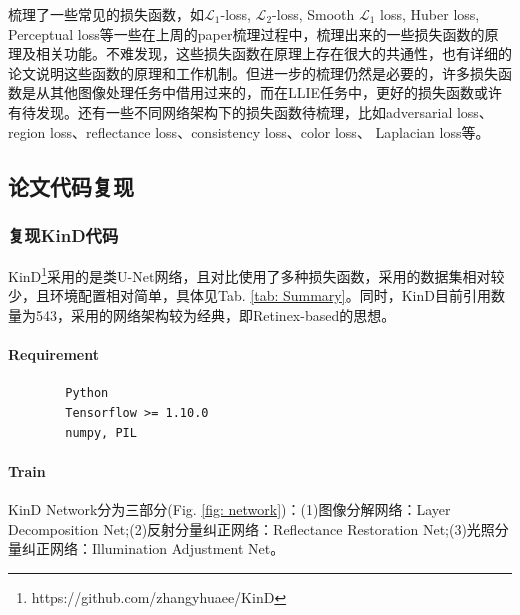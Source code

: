 \documentclass[letterpaper,12pt]{article}
\begin{document}
	梳理了一些常见的损失函数，如$\mathcal{L}_1$-loss, $\mathcal{L}_2$-loss, Smooth $\mathcal{L}_1$ loss, Huber loss, Perceptual loss等一些在上周的paper梳理过程中，梳理出来的一些损失函数的原理及相关功能。不难发现，这些损失函数在原理上存在很大的共通性，也有详细的论文说明这些函数的原理和工作机制。但进一步的梳理仍然是必要的，许多损失函数是从其他图像处理任务中借用过来的，而在LLIE任务中，更好的损失函数或许有待发现。还有一些不同网络架构下的损失函数待梳理，比如adversarial loss、region loss、reflectance loss、consistency loss、color loss、 Laplacian loss等。
	
	
	\subsection{论文代码复现}
	
	\subsubsection{复现KinD代码}
	
	KinD\footnote{https://github.com/zhangyhuaee/KinD}采用的是类U-Net网络，且对比使用了多种损失函数，采用的数据集相对较少，且环境配置相对简单，具体见Tab. \ref{tab: Summary}。同时，KinD\cite{10.1145/3343031.3350926}目前引用数量为543，采用的网络架构较为经典，即Retinex-based的思想。
	
	\paragraph{Requirement}
	
	\lstset{language=python,breaklines=true}
	\begin{lstlisting}
		Python
		Tensorflow >= 1.10.0
		numpy, PIL
	\end{lstlisting}
	
	\paragraph{Train}
	
	KinD Network分为三部分(Fig. \ref{fig: network})：(1)图像分解网络：Layer Decomposition Net;(2)反射分量纠正网络：Reflectance Restoration Net;(3)光照分量纠正网络：Illumination Adjustment Net。
	
\end{document}
